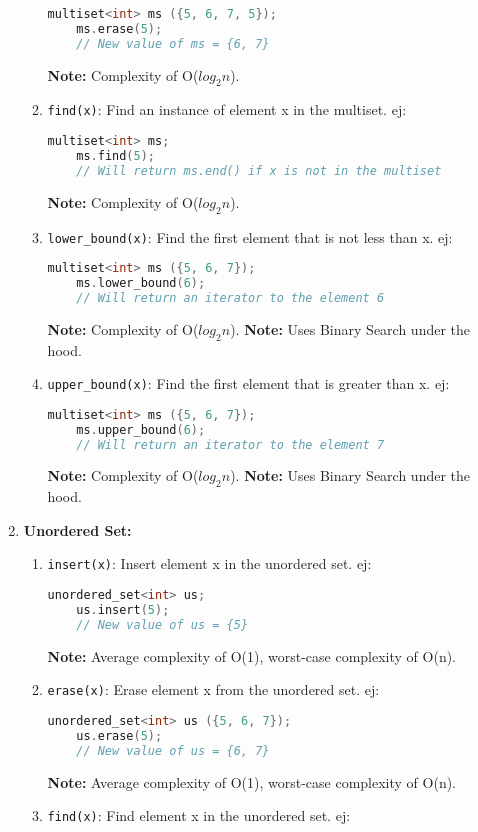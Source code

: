 \begin{enumerate}
\begin{enumerate}
\begin{lstlisting}[language=C++]
	multiset<int> ms ({5, 6, 7, 5});
	ms.erase(5);
	// New value of ms = {6, 7}
	\end{lstlisting}
	\textbf{Note:} Complexity of O($log_2n$).
      \item \texttt{find(x)}: Find an instance of element x in the multiset. ej:
	\begin{lstlisting}[language=C++]
	multiset<int> ms;
	ms.find(5);
	// Will return ms.end() if x is not in the multiset
	\end{lstlisting}
	\textbf{Note:} Complexity of O($log_2n$).
      \item \texttt{lower\_bound(x)}: Find the first element that is not less than x. ej:
	\begin{lstlisting}[language=C++]
	multiset<int> ms ({5, 6, 7});
	ms.lower_bound(6);
	// Will return an iterator to the element 6
	\end{lstlisting}
	\textbf{Note:} Complexity of O($log_2n$).
	\textbf{Note:} Uses Binary Search under the hood.
      \item \texttt{upper\_bound(x)}: Find the first element that is greater than x. ej:
	\begin{lstlisting}[language=C++]
	multiset<int> ms ({5, 6, 7});
	ms.upper_bound(6);
	// Will return an iterator to the element 7
	\end{lstlisting}
	\textbf{Note:} Complexity of O($log_2n$).
	\textbf{Note:} Uses Binary Search under the hood.
    \end{enumerate}
  \item \textbf{Unordered Set:}
    \begin{enumerate}
      \item \texttt{insert(x)}: Insert element x in the unordered set. ej:
	\begin{lstlisting}[language=C++]
	unordered_set<int> us;
	us.insert(5);
	// New value of us = {5}
	\end{lstlisting}
	\textbf{Note:} Average complexity of O(1), worst-case complexity of O(n).
      \item \texttt{erase(x)}: Erase element x from the unordered set. ej:
	\begin{lstlisting}[language=C++]
	unordered_set<int> us ({5, 6, 7});
	us.erase(5);
	// New value of us = {6, 7}
	\end{lstlisting}
	\textbf{Note:} Average complexity of O(1), worst-case complexity of O(n).
      \item \texttt{find(x)}: Find element x in the unordered set. ej:
	\begin{lstlisting}[language=C++]

\end{lstlisting}
\end{enumerate}
\end{enumerate}
